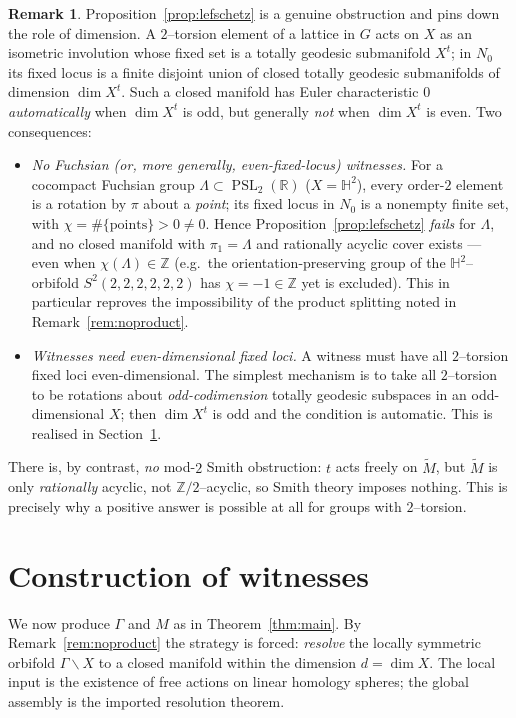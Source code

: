 \documentclass[12pt]{article}
\newcommand{\bR}{\mathbb{R}}
\newcommand{\bZ}{\mathbb{Z}}
\newcommand{\bH}{\mathbb{H}}
\DeclareMathOperator{\PSL}{PSL}
\theoremstyle{definition}
\newtheorem{remark}{Remark}
\begin{document}
\begin{remark}\label{rem:fuchsian}
Proposition~\ref{prop:lefschetz} is a genuine obstruction and pins down the role
of dimension.  A $2$--torsion element of a lattice in $G$ acts on $X$ as an
isometric involution whose fixed set is a totally geodesic submanifold $X^{t}$;
in $N_0$ its fixed locus is a finite disjoint union of closed totally geodesic
submanifolds of dimension $\dim X^{t}$.  Such a closed manifold has Euler
characteristic $0$ \emph{automatically} when $\dim X^{t}$ is odd, but generally
\emph{not} when $\dim X^{t}$ is even.  Two consequences:
\begin{itemize}
\item \emph{No Fuchsian (or, more generally, even-fixed-locus) witnesses.}  For a
cocompact Fuchsian group $\Lambda\subset\PSL_2(\bR)$ ($X=\bH^2$), every order-$2$
element is a rotation by $\pi$ about a \emph{point}; its fixed locus in $N_0$ is a
nonempty finite set, with $\chi=\#\{\text{points}\}>0\neq0$.  Hence
Proposition~\ref{prop:lefschetz} \emph{fails} for $\Lambda$, and no closed
manifold with $\pi_1=\Lambda$ and rationally acyclic cover exists --- even when
$\chi(\Lambda)\in\bZ$ (e.g.\ the orientation-preserving group of the
$\bH^2$--orbifold $S^2(2,2,2,2,2,2)$ has $\chi=-1\in\bZ$ yet is excluded).  This
in particular reproves the impossibility of the product splitting noted in
Remark~\ref{rem:noproduct}.
\item \emph{Witnesses need even-dimensional fixed loci.}  A witness must have all
$2$--torsion fixed loci even-dimensional.  The simplest mechanism is to take all
$2$--torsion to be rotations about \emph{odd-codimension} totally geodesic
subspaces in an odd-dimensional $X$; then $\dim X^{t}$ is odd and the condition is
automatic.  This is realised in Section~\ref{sec:construction}.
\end{itemize}
There is, by contrast, \emph{no} mod-$2$ Smith obstruction: $t$ acts freely on
$\widetilde M$, but $\widetilde M$ is only \emph{rationally} acyclic, not
$\bZ/2$--acyclic, so Smith theory imposes nothing.  This is precisely why a
positive answer is possible at all for groups with $2$--torsion.
\end{remark}

\section{Construction of witnesses}\label{sec:construction}

We now produce $\Gamma$ and $M$ as in Theorem~\ref{thm:main}.  By
Remark~\ref{rem:noproduct} the strategy is forced: \emph{resolve} the locally
symmetric orbifold $\Gamma\backslash X$ to a closed manifold within the dimension
$d=\dim X$.  The local input is the existence of free actions on linear homology
spheres; the global assembly is the imported resolution theorem.
\end{document}
